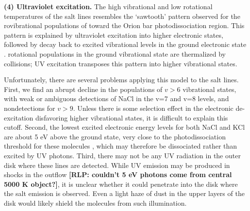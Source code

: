 \documentclass[twocolumn]{aastex62}
\newcommand{\sourcei}{SrcI\xspace}
\newcommand{\rlp}[1]{\textcolor{blue!65!black}{\textbf{[RLP: #1]}}}
\begin{document}
\par{\textbf{(4) Ultraviolet excitation.}}
%
%
The high vibrational and low rotational temperatures of the
salt lines resembles the `sawtooth' pattern observed for the rovibrational
populations of \hh toward the Orion bar photodissociation region.  This
pattern is explained by ultraviolet excitation into higher electronic states,
followed by decay back to excited vibrational levels in the ground electronic
state \citep{Kaplan2017a}.  \hh rotational populations in the ground vibrational
state are thermalized by collisions; UV excitation transposes this pattern into
higher vibrational states.


Unfortunately, there are several problems applying this model to the salt lines.
First, we find an abrupt decline in the populations of $v > 6$ vibrational states,
with weak or ambiguous detections of NaCl in the v=7 and v=8 levels, and
nondetections for $v > 9$.  Unless there is
some selection effect in the electronic de-excitation disfavoring higher vibrational
states, it is difficult to explain this cutoff.  
Second, the lowest excited electronic energy levels for both NaCl and KCl are about
5 eV above the ground state, very close to the photodissociation threshold for these
molecules \citep{Zeiri1983, Silver1986}, which
may therefore be dissociated rather than excited by UV photons.
Third, there may not be any UV radiation in the outer disk where these lines
are detected.  
While UV
emission may be produced in shocks in the outflow \rlp{couldn't 5 eV photons come from 
central 5000 K object?}, it is unclear whether
it could penetrate into the disk where
the salt emission is observed.  Even a light haze of dust in the upper layers of
the disk would likely shield the molecules from such illumination.
\end{document}
